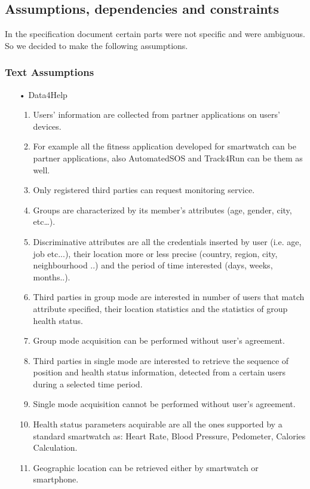 \subsection{Assumptions, dependencies and constraints}
In the specification document certain parts were not specific and were ambiguous. So we decided to make the following assumptions.

\subsubsection{Text Assumptions}
\begin{enumerate}

\item[•] {\Large Data4Help}
	\begin{enumerate}
	\item Users' information are collected from partner applications on users' devices.
	\item For example all the fitness application developed for smartwatch can be partner applications, also AutomatedSOS and Track4Run can be them as well.
	\item Only registered third parties can request monitoring service.
	\item Groups are characterized by its member’s attributes (age, gender, city, etc…).
	\item Discriminative attributes are all the credentials inserted by user (i.e. age, job etc...), their location more or less precise (country, region, city, neighbourhood ..) and the period of time interested (days, weeks, months..).
	\item Third parties in group mode are interested in number of users that match attribute specified, their location statistics and the statistics of group health status.
	\item Group mode acquisition can be performed without user's agreement.
	\item Third parties in single mode are interested to retrieve the sequence of position and health status information, detected from a certain users during a selected time period.	
	\item Single mode acquisition cannot be performed without user's agreement.
	\item Health status parameters acquirable are all the ones supported by a standard smartwatch as: Heart Rate, Blood Pressure, Pedometer, Calories Calculation.
	\item Geographic location can be retrieved either by smartwatch or smartphone.
	\end{enumerate}
	

\end{enumerate}
